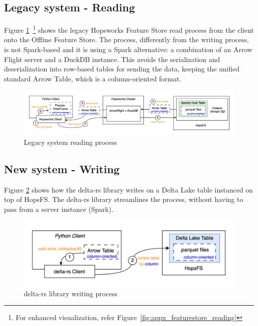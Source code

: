 \subsection{Legacy system - Reading}
\label{subsec:legacy_sys_reading}

Figure \ref{fig:featurestore_reading}~\footnote{For enhanced visualization, refer Figure~\ref{fig:appx_featurestore_reading}} shows the legacy Hopsworks Feature Store read process from the client onto the Offline Feature Store. The process, differently from the writing process, is not Spark-based and it is using a Spark alternative: a combination of an Arrow Flight server and a DuckDB instance. This avoids the serialization and deserialization into row-based tables for sending the data, keeping the unified standard Arrow Table, which is a column-oriented format.

\begin{figure}
    \begin{center}
      \includegraphics[width=\textwidth]{figures/2-background/FeatureStore-reading.png}
    \end{center}
    \caption{Legacy system reading process}
    \label{fig:featurestore_reading}
\end{figure}

\subsection{New system - Writing}

Figure \ref{fig:delta_rs_writing} shows how the delta-rs library writes on a Delta Lake table instanced on top of \gls{HopsFS}. The delta-rs library streamlines the process, without having to pass from a server instance (Spark).

\begin{figure}
    \begin{center}
      \includegraphics[width=\textwidth]{figures/2-background/delta-rs_writing.png}
    \end{center}
    \caption{delta-rs library writing process}
    \label{fig:delta_rs_writing}
\end{figure}

